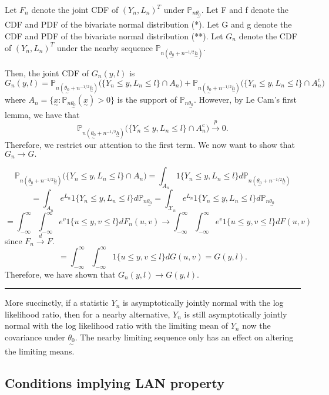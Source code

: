 \documentclass[twoside]{article}
\newenvironment{proof}{{\bf Proof:}}{\hfill\rule{2mm}{2mm}}
\newcommand{\prob}{\mathbb{P}}
\newcommand{\utilde}{\underset{\sim}}
\begin{document}
\begin{proof} Let $F_n$ denote the joint CDF of $(Y_n, L_n)^T$ under $\prob_{n \utilde{\theta_0}}.$ Let F and f denote the CDF and PDF of the bivariate normal distribution (*). Let G and g denote the CDF and PDF of the bivariate normal distribution (**). Let $G_n$ denote the CDF of $(Y_n, L_n)^T$ under the nearby sequence $\prob_{n(\utilde{\theta_0} + n^{-1/2}\utilde{h})}$. 

Then, the joint CDF of $G_n(y,l)$ is 
$$
G_n(y,l) = \prob_{n(\utilde{\theta_0} + n^{-1/2}\utilde{h})}\bigg(\{Y_n \leq y, L_n \leq l\} \cap A_n \bigg) + \prob_{n(\utilde{\theta_0} + n^{-1/2}\utilde{h})}\bigg(\{Y_n \leq y, L_n \leq l\} \cap A_n^c \bigg)
$$
where $A_n = \{\utilde{x}: \prob_{n\utilde{\theta_0}}(\utilde{x}) > 0\}$ is the support of $\prob_{n\utilde{\theta_0}}.$ However, by Le Cam's first lemma, we have that 
$$
\prob_{n(\utilde{\theta_0} + n^{-1/2}\utilde{h})}\bigg(\{Y_n \leq y, L_n \leq l\} \cap A_n^c \bigg) \xrightarrow{p} 0.
$$
Therefore, we restrict our attention to the first term. We now want to show that $G_n \rightarrow G.$

$$
\prob_{n(\utilde{\theta_0} + n^{-1/2}\utilde{h})}\bigg(\{Y_n \leq y, L_n \leq l\} \cap A_n \bigg) = \int_{A_n}1\{Y_n \leq y, L_n \leq l\}d\prob_{n(\utilde{\theta_0} + n^{-1/2}\utilde{h})}
$$
$$
= \int_{A_n}e^{L_n}1\{Y_n \leq y, L_n \leq l\}d\prob_{n\utilde{\theta_0}} = \int_{\mathcal{X}_n}e^{L_n}1\{Y_n \leq y, L_n \leq l\}d\prob_{n\utilde{\theta_0}}
$$
$$
= \int_{-\infty}^{\infty}\int_{-\infty}^{\infty}e^v1\{u \leq y, v \leq l\}dF_n(u,v) \rightarrow \int_{-\infty}^{\infty}\int_{-\infty}^{\infty}e^v1\{u \leq y, v \leq l\}dF(u,v)
$$
since $F_n \xrightarrow{d} F.$ 
$$
= \int_{-\infty}^{\infty}\int_{-\infty}^{\infty}1\{u \leq y, v \leq l\}dG(u,v) = G(y, l).
$$
Therefore, we have shown that $G_n(y,l) \rightarrow G(y,l).$
\end{proof}

More succinctly, if a statistic $Y_n$ is asymptotically jointly normal with the log likelihood ratio, then for a nearby alternative, $Y_n$ is still asymptotically jointly normal with the log likelihood ratio with the limiting mean of $Y_n$ now the covariance under $\utilde{\theta_0}$. The nearby limiting sequence only has an effect on altering the limiting means.

\subsection{Conditions implying LAN property}
\end{document}
